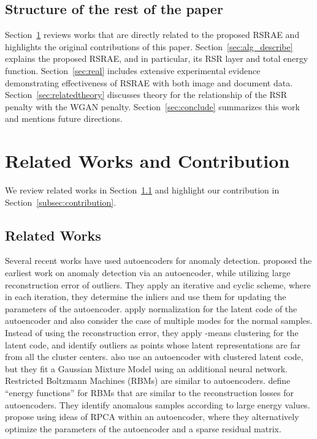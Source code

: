 \documentclass{article} \usepackage{iclr2020_conference,times}
\def\Secref#1{Section~\ref{#1}}
\begin{document}
\subsection{Structure of the rest of the paper}
\Secref{sec:relatedwork} reviews works that are directly related to the proposed RSRAE and highlights the original contributions of this paper. \Secref{sec:alg_describe} explains the proposed RSRAE, and in particular, its RSR layer and total energy function. \Secref{sec:real} includes extensive experimental evidence demonstrating  effectiveness of RSRAE with both image and document data. 
\Secref{sec:relatedtheory} discusses theory for the relationship of the RSR penalty with the WGAN penalty.
\Secref{sec:conclude} summarizes this work and mentions future directions. 

\section{Related Works and Contribution}\label{sec:relatedwork}

We review related works in \Secref{subsec:relatedworks} and highlight our contribution in \Secref{subsec:contribution}.

\subsection{Related Works}\label{subsec:relatedworks}
Several recent works have used autoencoders for anomaly detection. 
\citet{xia2015learning} proposed the earliest work on anomaly detection via an autoencoder, while utilizing large reconstruction error of outliers. They apply an iterative and cyclic scheme, where in each iteration, they determine the inliers and use them for updating the parameters of the autoencoder. \citet{aytekin2018clustering} apply  normalization for the latent code of the autoencoder and also consider the case of multiple modes for the normal samples. Instead of using the reconstruction error, they apply -means clustering for the latent code, and identify outliers as points whose latent representations are far from all the cluster centers. \citet{zong2018deep} also use an autoencoder with clustered latent code, but they fit a Gaussian Mixture Model using an additional neural network.
Restricted Boltzmann Machines (RBMs) are similar to autoencoders. \citet{zhai2016deep} define ``energy functions'' for RBMs that are similar to the reconstruction losses for autoencoders. They identify anomalous samples according to large energy values. \citet{chalapathy2017robust} propose using ideas of RPCA within an autoencoder, where they alternatively optimize the parameters of the autoencoder and a sparse residual matrix.
\end{document}
